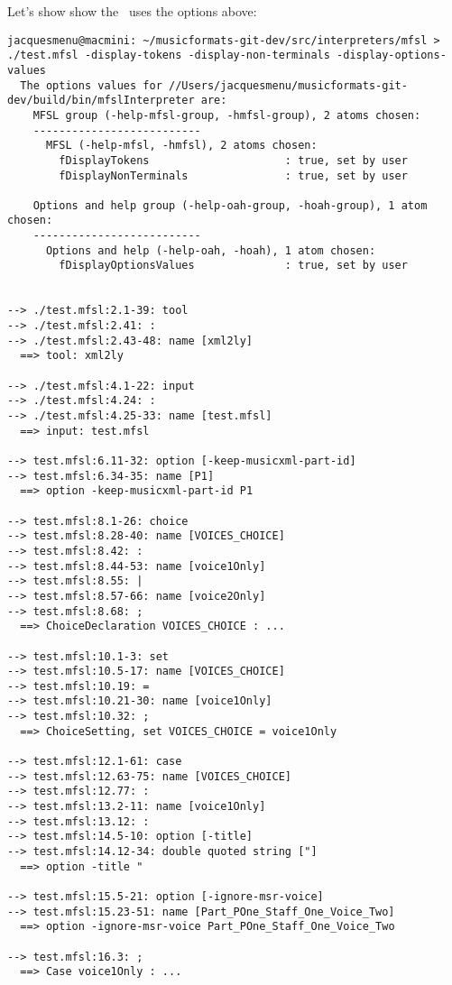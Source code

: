 Let's show show the \mfslLangInterp\ uses the options above:
\begin{lstlisting}[language=Terminal]
jacquesmenu@macmini: ~/musicformats-git-dev/src/interpreters/mfsl > ./test.mfsl -display-tokens -display-non-terminals -display-options-values
  The options values for //Users/jacquesmenu/musicformats-git-dev/build/bin/mfslInterpreter are:
    MFSL group (-help-mfsl-group, -hmfsl-group), 2 atoms chosen:
    --------------------------
      MFSL (-help-mfsl, -hmfsl), 2 atoms chosen:
        fDisplayTokens                     : true, set by user
        fDisplayNonTerminals               : true, set by user
    
    Options and help group (-help-oah-group, -hoah-group), 1 atom chosen:
    --------------------------
      Options and help (-help-oah, -hoah), 1 atom chosen:
        fDisplayOptionsValues              : true, set by user
    
  
--> ./test.mfsl:2.1-39: tool
--> ./test.mfsl:2.41: :
--> ./test.mfsl:2.43-48: name [xml2ly]
  ==> tool: xml2ly

--> ./test.mfsl:4.1-22: input
--> ./test.mfsl:4.24: :
--> ./test.mfsl:4.25-33: name [test.mfsl]
  ==> input: test.mfsl

--> test.mfsl:6.11-32: option [-keep-musicxml-part-id]
--> test.mfsl:6.34-35: name [P1]
  ==> option -keep-musicxml-part-id P1

--> test.mfsl:8.1-26: choice
--> test.mfsl:8.28-40: name [VOICES_CHOICE]
--> test.mfsl:8.42: :
--> test.mfsl:8.44-53: name [voice1Only]
--> test.mfsl:8.55: |
--> test.mfsl:8.57-66: name [voice2Only]
--> test.mfsl:8.68: ;
  ==> ChoiceDeclaration VOICES_CHOICE : ...

--> test.mfsl:10.1-3: set
--> test.mfsl:10.5-17: name [VOICES_CHOICE]
--> test.mfsl:10.19: =
--> test.mfsl:10.21-30: name [voice1Only]
--> test.mfsl:10.32: ;
  ==> ChoiceSetting, set VOICES_CHOICE = voice1Only

--> test.mfsl:12.1-61: case
--> test.mfsl:12.63-75: name [VOICES_CHOICE]
--> test.mfsl:12.77: :
--> test.mfsl:13.2-11: name [voice1Only]
--> test.mfsl:13.12: :
--> test.mfsl:14.5-10: option [-title]
--> test.mfsl:14.12-34: double quoted string ["]
  ==> option -title "

--> test.mfsl:15.5-21: option [-ignore-msr-voice]
--> test.mfsl:15.23-51: name [Part_POne_Staff_One_Voice_Two]
  ==> option -ignore-msr-voice Part_POne_Staff_One_Voice_Two

--> test.mfsl:16.3: ;
  ==> Case voice1Only : ...


\end{lstlisting}
